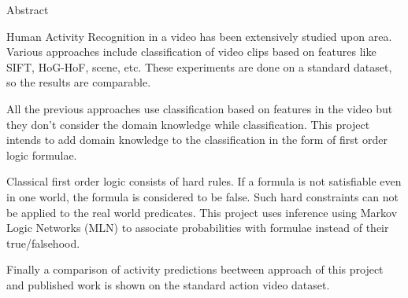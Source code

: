 \begin{center}
\LARGE{Abstract}
\end{center}

\vspace{0.5in}

Human Activity Recognition in a video has been extensively studied upon area. 
Various approaches include classification of video clips based on features like SIFT, HoG-HoF, scene, etc.
These experiments are done on a standard dataset, so the results are comparable.

All the previous approaches use classification based on features in the video but they don't consider the domain knowledge while classification.
This project intends to add domain knowledge to the classification in the form of first order logic formulae.

Classical first order logic consists of hard rules. 
If a formula is not satisfiable even in one world, 
the formula is considered to be false. 
Such hard constraints can not be applied to the real world predicates. 
This project uses inference using Markov Logic Networks (MLN) 
to associate probabilities with formulae instead of their true/falsehood.

Finally a comparison of activity predictions beetween 
approach of this project and 
published work is shown on the standard action video dataset.
